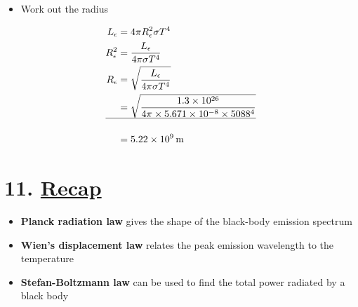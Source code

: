 \documentclass[
  letterpaper,
  DIV=11,
  numbers=noendperiod]{scrartcl}
\providecommand{\tightlist}{%
  \setlength{\itemsep}{0pt}\setlength{\parskip}{0pt}}\usepackage{longtable,booktabs,array}
\begin{document}
\begin{itemize}
\tightlist
\item
  Work out the radius
\end{itemize}

\begin{align}
L_\epsilon &= 4\pi R_\epsilon^2 \sigma T^4 \\
R_\epsilon^2 &= \frac{L_\epsilon}{4\pi \sigma T^4} \\
R_\epsilon &= \sqrt{\frac{L_\epsilon}{4\pi \sigma T^4}} \\
&= \sqrt{\frac{1.3\times 10^{26}}{4\pi \times 5.671\times10^{-8}\times 5088^4}}  \\
\hline \\
&= 5.22\times 10^{9}\,\mathrm{m}
\end{align}

\hypertarget{recap-1}{%
\section{\texorpdfstring{11.
\protect\hyperlink{toc0_}{Recap}}{11. Recap}}\label{recap-1}}

\begin{itemize}
\tightlist
\item
  \textbf{Planck radiation law} gives the shape of the black-body
  emission spectrum
\item
  \textbf{Wien's displacement law} relates the peak emission wavelength
  to the temperature
\item
  \textbf{Stefan-Boltzmann law} can be used to find the total power
  radiated by a black body
\end{itemize}
\end{document}
